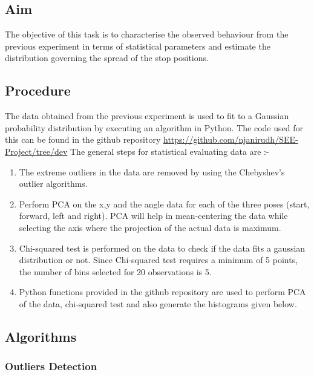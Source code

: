 \documentclass[10pt,a4paper]{article}
\begin{document}
\subsection{Aim}
\Large
The objective of this task is to characterise the observed behaviour from the previous experiment in terms of statistical parameters and estimate the distribution governing the spread of the stop positions.

\subsection{Procedure}

The data obtained from the previous experiment is used to fit to a Gaussian probability distribution by executing an algorithm in Python. The code used for this can be found in the github repository \href{https://github.com/njanirudh/SEE-Project/tree/dev}{https://github.com/njanirudh/SEE-Project/tree/dev}
The general steps for statistical evaluating data are :-
\begin{enumerate}
	\item The extreme outliers in the data are removed by using the Chebyshev's outlier algorithms. 
	\item Perform PCA on the x,y and the angle data for each of the three poses (start, forward, left and right). 
	PCA will help in mean-centering the data while selecting the axis where the projection of the actual data is maximum. 
	\item Chi-squared test is performed on the data to check if the data fits a gaussian distribution or not. 
	Since Chi-squared test requires a minimum of 5 points, the number of bins selected for 20 observations is 5.
	\item Python functions provided in the github repository are used to perform PCA of the data, chi-squared test and also generate the histograms given below.
	
\end{enumerate}


\newpage

{\color{blue}\subsection{Algorithms}}	
\subsubsection{Outliers Detection}
\end{document}
